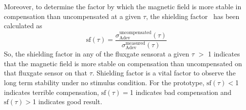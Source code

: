 \FloatBarrier

Moreover, to determine the factor by which the magnetic field is more stable in compensation than uncompensated at a given $\tau$, the shielding factor~\cite{bea} has been calculated as
\begin{equation}\label{eq:sf}
    \text{sf} (\tau)=\frac{\sigma_{\text{Adev}}^{\text{uncompensated}}(\tau)}{\sigma_{\text{Adev}}^{\text{measured}}(\tau)}
\end{equation}
So, the shielding factor in any of the fluxgate sensorat a given $\tau$  $>$ 1 indicates that the magnetic field is more stable on compensation than uncompensated on that fluxgate sensor on that $\tau$. Shielding factor is a vital factor to observe the long term stability under no stimulus condition. For the prototype, $\text{sf} (\tau)<$1 indicates terrible compensation, $\text{sf} (\tau)=$1 indicates bad compensation and $\text{sf} (\tau)>$1 indicates good result.
 

 
 
 